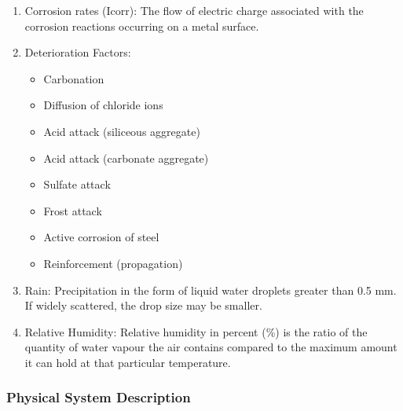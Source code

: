 \documentclass[12pt]{article}
\begin{document}
\begin{enumerate}
    \item Corrosion rates (Icorr): The flow of electric charge associated with the corrosion reactions occurring on a metal surface.

    \item Deterioration Factors:
    \begin{itemize}
        \item Carbonation
    \end{itemize}
    \begin{itemize}
        \item Diffusion of chloride ions
    \end{itemize}
    \begin{itemize}
        \item Acid attack (siliceous aggregate)
    \end{itemize}
    \begin{itemize}
        \item Acid attack (carbonate aggregate)
    \end{itemize}
    \begin{itemize}
        \item Sulfate attack
    \end{itemize}
    \begin{itemize}
        \item Frost attack
    \end{itemize}
    \begin{itemize}
        \item Active corrosion of steel
    \end{itemize}
    \begin{itemize}
        \item Reinforcement (propagation)
    \end{itemize}

    \item Rain: Precipitation in the form of liquid water droplets greater than 0.5 mm. If widely scattered, the drop size may be smaller.

    \item Relative Humidity: Relative humidity in percent (\%) is the ratio of the quantity of water vapour the air contains compared to the maximum amount it can hold at that particular temperature. 
\end{enumerate}

\subsubsection{Physical System Description} \label{sec_phySystDescrip}
\end{document}
